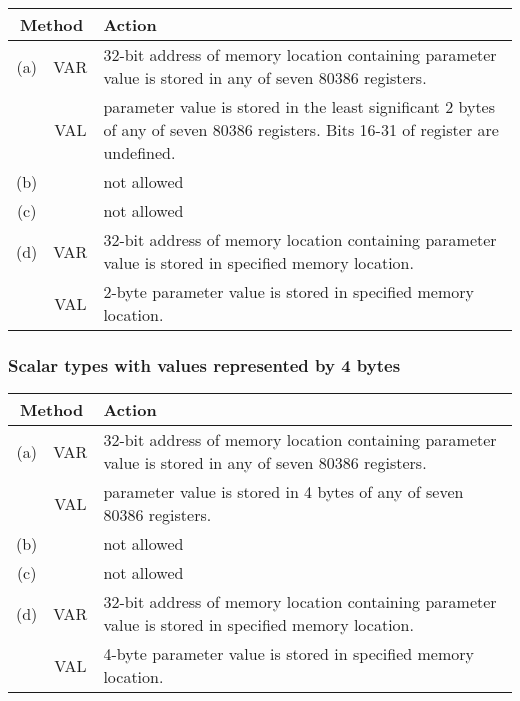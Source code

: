 \begin{tabular}{|c|c|p{8cm}|}  \hline
\multicolumn{2}{|c|}{Method} & Action \\ \hline
(a) & VAR & 32-bit address of memory location containing parameter
            value is stored in any of seven 80386 registers.        \\
    & VAL & parameter value is stored in the least significant
            2 bytes of any of seven 80386 registers.
            Bits 16-31 of register are undefined.                   \\ \hline
(b) && not allowed                                                  \\ \hline
(c) && not allowed                                                  \\ \hline
(d) & VAR & 32-bit address of memory location containing parameter
            value is stored in specified memory location.           \\
    & VAL & 2-byte parameter value is stored in specified memory
            location.                                               \\ \hline
\end{tabular}

\subsubsection{Scalar types with values represented by 4 bytes}

\begin{tabular}{|c|c|p{8cm}|} \hline
\multicolumn{2}{|c|}{Method} & Action \\ \hline
(a) & VAR & 32-bit address of memory location containing parameter
            value is stored in any of seven 80386 registers.       \\
    & VAL & parameter value is stored in 4 bytes of any
            of seven 80386 registers.                              \\ \hline
(b) && not allowed                                                 \\ \hline
(c) && not allowed                                                 \\ \hline
(d) & VAR & 32-bit address of memory location containing parameter
         value is stored in specified memory location.             \\
    & VAL & 4-byte parameter value is stored in specified memory
            location.                                              \\ \hline
\end{tabular}

